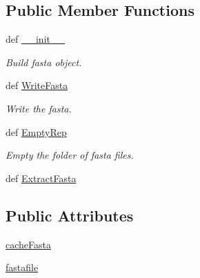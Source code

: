\subsection*{\-Public \-Member \-Functions}
\begin{DoxyCompactItemize}
\item 
def \hyperlink{classirna_1_1iRNA__pred_1_1Fasta_1_1Fasta_ada3895733bac146ebeed0ed16664276f}{\-\_\-\-\_\-init\-\_\-\-\_\-}
\begin{DoxyCompactList}\small\item\em \-Build fasta object. \end{DoxyCompactList}\item 
def \hyperlink{classirna_1_1iRNA__pred_1_1Fasta_1_1Fasta_a801dd574dc79ccaae741fc5bb5f992ec}{\-Write\-Fasta}
\begin{DoxyCompactList}\small\item\em \-Write the fasta. \end{DoxyCompactList}\item 
def \hyperlink{classirna_1_1iRNA__pred_1_1Fasta_1_1Fasta_a54f9131171e47763bd69e40e945453ac}{\-Empty\-Rep}
\begin{DoxyCompactList}\small\item\em \-Empty the folder of fasta files. \end{DoxyCompactList}\item 
def \hyperlink{classirna_1_1iRNA__pred_1_1Fasta_1_1Fasta_ae603f02598a3d1c957405b4ca30902b4}{\-Extract\-Fasta}
\end{DoxyCompactItemize}
\subsection*{\-Public \-Attributes}
\begin{DoxyCompactItemize}
\item 
\hyperlink{classirna_1_1iRNA__pred_1_1Fasta_1_1Fasta_ac05256ad571855ecdd1ff4e8eeaa9803}{cache\-Fasta}
\item 
\hyperlink{classirna_1_1iRNA__pred_1_1Fasta_1_1Fasta_ae664b5739a04db19c16e425f47a035af}{fastafile}
\end{DoxyCompactItemize}
